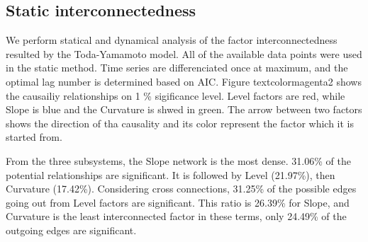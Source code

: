 \documentclass[12pt,bibliography=totoc]{article}
\begin{document}
{\subsection{Static interconnectedness}


We perform statical and dynamical analysis of the factor interconnectedness resulted by the Toda-Yamamoto model. All of the available data points were used in the static method. Time series are differenciated once at maximum, and the optimal lag number is determined based on AIC. Figure textcolor{magenta}{2} shows the causailiy relationships on 1 \% sigificance level. Level factors are red, while Slope is blue and the Curvature is shwed in green. The arrow between two factors shows the direction of tha causality and its color represent the factor which it is started from.


From the three subsystems, the Slope network is the most dense. 31.06\% of the potential relationships are significant. It is followed by Level (21.97\%), then Curvature (17.42\%). Considering cross connections, 31.25\% of the possible edges going out from Level factors are significant. This ratio is 26.39\% for Slope, and Curvature is the least interconnected factor in these terms, only 24.49\% of the outgoing edges are significant.


\begin{figure}[H]


\end{figure}}
\end{document}

